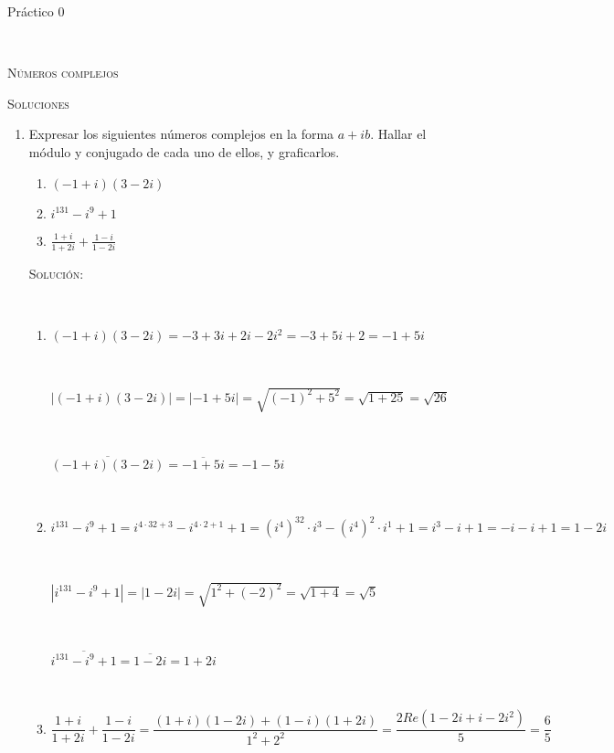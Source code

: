 \documentclass[12pt]{amsart}
\begin{document}

\centerline{\Large{Pr\' actico 0}}

\

\centerline{\textsc{N\'{u}meros complejos}}

\centerline{\textsc{Soluciones}}

\bigbreak 

\begin{enumerate}

\item Expresar los siguientes n{\'u}meros complejos en la forma $a +i b$.
Hallar el m{\'o}dulo y conjugado de cada uno de ellos, y graficarlos.

\begin{multicols}{3}
\begin{enumerate}
\item $(-1+i) (3-2i)$
\item $i^{131} - i^9 +1$
\item $\frac {1+i}{1+2i} + \frac{1-i}{1-2i}$
\end{enumerate}
\end{multicols}

\textsc{Solución:}

\

\begin{enumerate}
    \item $(-1+i) (3-2i) = -3 + 3i + 2i - 2i^2 = -3 + 5i + 2 = \boxed{-1 + 5i}$

\

$ | (-1+i) (3-2i) | = | -1 + 5i | = \sqrt{ (-1)^2 + 5^2 } = \sqrt{1 + 25 } = \boxed{\sqrt{ 26}}$

\

$ \overline{ (-1+i) (3-2i) } = \overline { -1 + 5i } = \boxed{ -1 -5i }$

\

\item $i^{131} - i^9 +1 = i^{4 \cdot 32 + 3} - i^{4 \cdot 2 + 1} +1 = 
(i^4)^{32} \cdot i^3 - (i^4)^2 \cdot i^1 + 1 = i^3 - i +1 = -i -i +1 = \boxed{ 1-2i}$

\

$ | i^{131} - i^9 +1 | = | 1-2i | = \sqrt{ 1^2 + (-2)^2 } = \sqrt{1 + 4 } = \boxed{\sqrt{ 5}}$

\

$ \overline{ i^{131} - i^9 +1  } = \overline { 1-2i} = \boxed{ 1+2i}$

\

\item $\dfrac {1+i}{1+2i} + \dfrac{1-i}{1-2i} = \dfrac{(1+i)(1-2i)+(1-i)(1+2i)}{1^2 + 2^2} = \dfrac{2 Re( 1 - 2i + i - 2 i^2) }{5} = \boxed{ \dfrac{6}{5} }$


\end{enumerate}
\end{enumerate}
\end{document}
